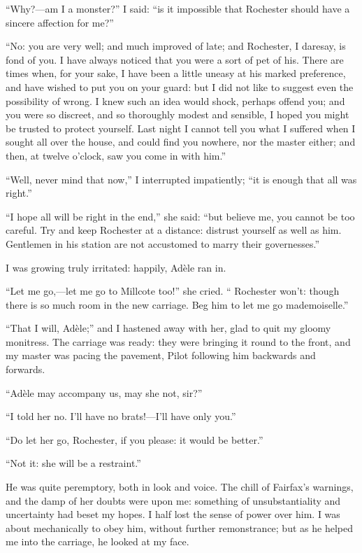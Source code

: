 \enquote{Why?---am I a monster?} I said: \enquote{is it impossible that
	\Mr{} Rochester should have a sincere affection for me?}

\enquote{No: you are very well; and much improved of late; and \Mr{}
	Rochester, I daresay, is fond of you.  I have always noticed that you
	were a sort of pet of his.  There are times when, for your sake, I have
	been a little uneasy at his marked preference, and have wished to put
	you on your guard: but I did not like to suggest even the possibility of
	wrong.  I knew such an idea would shock, perhaps offend you; and you
	were so discreet, and so thoroughly modest and sensible, I hoped you
	might be trusted to protect yourself.  Last night I cannot tell you what
	I suffered when I sought all over the house, and could find you nowhere,
	nor the master either; and then, at twelve o'clock, saw you come in with
	him.}

\enquote{Well, never mind that now,} I interrupted impatiently;
\enquote{it is enough that all was right.}

\enquote{I hope all will be right in the end,} she said: \enquote{but
	believe me, you cannot be too careful.  Try and keep \Mr{} Rochester at a
	distance: distrust yourself as well as him.  Gentlemen in his station
	are not accustomed to marry their governesses.}

I was growing truly irritated: happily, Adèle ran in.

\enquote{Let me go,---let me go to Millcote too!} she cried.
\enquote{\Mr{} Rochester won't: though there is so much room in the new
	carriage.  Beg him to let me go mademoiselle.}

\enquote{That I will, Adèle;} and I hastened away with her, glad to quit
my gloomy monitress.  The carriage was ready: they were bringing it
round to the front, and my master was pacing the pavement, Pilot
following him backwards and forwards.

\enquote{Adèle may accompany us, may she not, sir?}

\enquote{I told her no.  I'll have no brats!---I'll have only you.}

\enquote{Do let her go, \Mr{} Rochester, if you please: it would be
	better.}

\enquote{Not it: she will be a restraint.}

He was quite peremptory, both in look and voice.  The chill of \Mrs{}
Fairfax's warnings, and the damp of her doubts were upon me: something
of unsubstantiality and uncertainty had beset my hopes.  I half lost the
sense of power over him.  I was about mechanically to obey him, without
further remonstrance; but as he helped me into the carriage, he looked
at my face.

